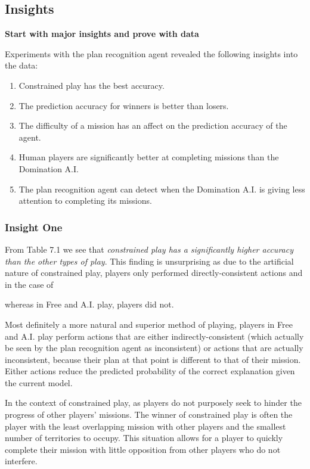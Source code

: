 \documentclass[parskip]{cs4rep}
\begin{document}
\subsection{Insights}

\textbf{Start with major insights and prove with data}

Experiments with the plan recognition agent revealed the following insights into the data:

\begin{enumerate}
\item
Constrained play has the best accuracy. 
\item
The prediction accuracy for winners is better than losers.
\item
The difficulty of a mission has an affect on the prediction accuracy of the agent.
\item
Human players are significantly better at completing missions than the Domination A.I.
\item
The plan recognition agent can detect when the Domination A.I. is giving less attention to completing its missions.\newline
\end{enumerate}

\subsubsection{Insight One}

From Table 7.1 we see that \textit{constrained play has a significantly higher accuracy than the other types of play}. This finding is unsurprising as due to the artificial nature of constrained play, players only performed directly-consistent actions and in the case of 

 whereas in Free and A.I. play, players did not. 

Most definitely a more natural and superior method of playing, players in Free and A.I. play perform actions that are either indirectly-consistent (which actually be seen by the plan recognition agent as inconsistent) or actions that are actually inconsistent, because their plan at that point is different to that of their mission. Either actions reduce the predicted probability of the correct explanation given the current model.

In the context of constrained play, as players do not purposely seek to hinder the progress of other players' missions. The winner of constrained play is often the player with the least overlapping mission with other players and the smallest number of territories to occupy. This situation allows for a player to quickly complete their mission with little opposition from other players who do not interfere.
\end{document}
